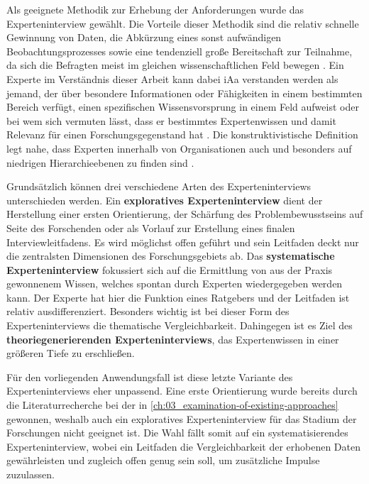 Als geeignete Methodik zur Erhebung der Anforderungen wurde das Experteninterview gewählt. Die Vorteile dieser Methodik sind die relativ schnelle Gewinnung von Daten, die Abkürzung eines sonst aufwändigen Beobachtungsprozesses sowie eine tendenziell große Bereitschaft zur Teilnahme, da sich die Befragten meist im gleichen wissenschaftlichen Feld bewegen \cite{401:Das-Experteninterview}. Ein Experte im Verständnis dieser Arbeit kann dabei \acrshort{iAa} \citeauthor{401:Das-Experteninterview} verstanden werden als jemand, der über besondere Informationen oder Fähigkeiten in einem bestimmten Bereich verfügt, einen spezifischen Wissensvorsprung in einem Feld aufweist oder bei wem sich vermuten lässt, dass er bestimmtes Expertenwissen und damit Relevanz für einen Forschungsgegenstand hat \cite{401:Das-Experteninterview}. Die konstruktivistische Definition legt nahe, dass Experten innerhalb von Organisationen auch und besonders auf niedrigen Hierarchieebenen zu finden sind \cite{401:Das-Experteninterview}.

Grundsätzlich können drei verschiedene Arten des Experteninterviews unterschieden werden. Ein \textbf{exploratives Experteninterview} dient der Herstellung einer ersten Orientierung, der Schärfung des Problembewusstseins auf Seite des Forschenden oder als Vorlauf zur Erstellung eines finalen Interviewleitfadens. Es wird möglichst offen geführt und sein Leitfaden deckt nur die zentralsten Dimensionen des Forschungsgebiets ab. Das \textbf{systematische Experteninterview} fokussiert sich auf die Ermittlung von aus der Praxis gewonnenem Wissen, welches spontan durch Experten wiedergegeben werden kann. Der Experte hat hier die Funktion eines Ratgebers und der Leitfaden ist relativ ausdifferenziert. Besonders wichtig ist bei dieser Form des Experteninterviews die thematische Vergleichbarkeit. Dahingegen ist es Ziel des \textbf{theoriegenerierenden Experteninterviews}, das Expertenwissen in einer größeren Tiefe zu erschließen. \cite{401:Das-Experteninterview}

Für den vorliegenden Anwendungsfall ist diese letzte Variante des Experteninterviews eher unpassend. Eine erste Orientierung wurde bereits durch die Literaturrecherche bei der  in \autoref{ch:03_examination-of-existing-approaches} gewonnen, weshalb auch ein exploratives Experteninterview für das Stadium der Forschungen nicht geeignet ist. Die Wahl fällt somit auf ein systematisierendes Experteninterview, wobei ein Leitfaden die Vergleichbarkeit der erhobenen Daten gewährleisten und zugleich offen genug sein soll, um zusätzliche Impulse zuzulassen.

